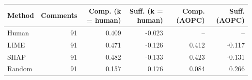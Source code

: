 \begin{tabular}{lrrrrr}
\toprule
Method & Comments & Comp. (k = human) & Suff. (k = human) & Comp. (AOPC) & Suff. (AOPC) \\
\midrule
Human & 91 & 0.409 & -0.023 & -- & -- \\
LIME & 91 & 0.471 & -0.126 & 0.412 & -0.117 \\
SHAP & 91 & 0.482 & -0.133 & 0.423 & -0.131 \\
Random & 91 & 0.157 & 0.176 & 0.084 & 0.266 \\
\bottomrule
\end{tabular}
